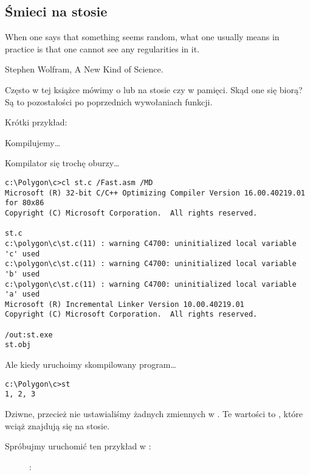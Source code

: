 \subsection{Śmieci na stosie}
\label{noise_in_stack}

\epigraph{When one says that something seems random, what one usually
means in practice is that one cannot see any regularities in it.}{Stephen Wolfram, A New Kind of Science.}

Często w tej książce mówimy o  lub  na stosie czy w pamięci.
Skąd one się biorą?
Są to pozostałości po poprzednich wywołaniach funkcji.

Krótki przykład:



Kompilujemy\dots



Kompilator się trochę oburzy\dots

\begin{lstlisting}
c:\Polygon\c>cl st.c /Fast.asm /MD
Microsoft (R) 32-bit C/C++ Optimizing Compiler Version 16.00.40219.01 for 80x86
Copyright (C) Microsoft Corporation.  All rights reserved.

st.c
c:\polygon\c\st.c(11) : warning C4700: uninitialized local variable 'c' used
c:\polygon\c\st.c(11) : warning C4700: uninitialized local variable 'b' used
c:\polygon\c\st.c(11) : warning C4700: uninitialized local variable 'a' used
Microsoft (R) Incremental Linker Version 10.00.40219.01
Copyright (C) Microsoft Corporation.  All rights reserved.

/out:st.exe
st.obj
\end{lstlisting}

Ale kiedy uruchoimy skompilowany program\dots

\begin{lstlisting}
c:\Polygon\c>st
1, 2, 3
\end{lstlisting}

Dziwne, przecież nie ustawialiśmy żadnych zmiennych w . 
Te wartości to , które wciąż znajdują się na stosie.

\clearpage
Spróbujmy uruchomić ten przykład w \olly:

\begin{figure}[H]
\centering
{}
\caption{\olly: }
\label{fig:stack_noise_olly1}
\end{figure}

